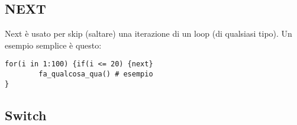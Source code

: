 \subsection{NEXT}

Next è usato per skip (saltare) una iterazione di un loop (di qualsiasi tipo). Un esempio semplice è questo:

\begin{lstlisting}
for(i in 1:100) {if(i <= 20) {next}
		fa_qualcosa_qua() # esempio
}
\end{lstlisting}


\subsection{Switch}





